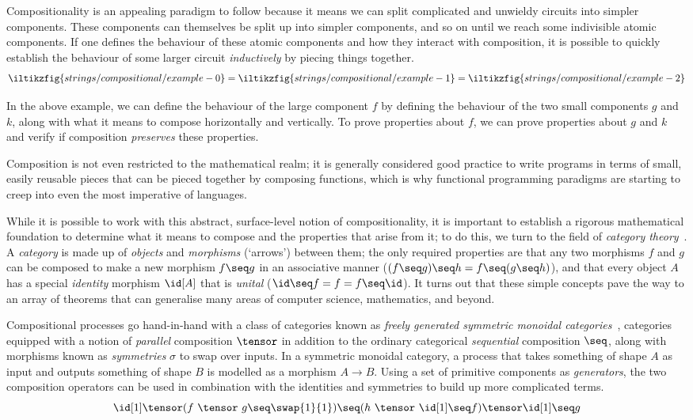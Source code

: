 Compositionality is an appealing paradigm to follow because it means we can
split complicated and unwieldy circuits into simpler components.
These components can themselves be split up into simpler components, and so on
until we reach some indivisible atomic components.
If one defines the behaviour of these atomic components and how they interact
with composition, it is possible to quickly establish the behaviour of some
larger circuit \emph{inductively} by piecing things together.
\[
    \iltikzfig{strings/compositional/example-0}
    =
    \iltikzfig{strings/compositional/example-1}
    =
    \iltikzfig{strings/compositional/example-2}
\]

In the above example, we can define the behaviour of the large component \(f\)
by defining the behaviour of the two small components \(g\) and \(k\), along
with what it means to compose horizontally and vertically.
To prove properties about \(f\), we can prove properties about \(g\) and \(k\)
and verify if composition \emph{preserves} these properties.

Composition is not even restricted to the mathematical realm; it is generally
considered good practice to write programs in terms of small, easily reusable
pieces that can be pieced together by composing functions, which is why
functional programming paradigms are starting to creep into even the most
imperative of languages.

While it is possible to work with this abstract, surface-level notion of
compositionality, it is important to establish a rigorous mathematical
foundation to determine what it means to compose and the properties that
arise from it; to do this, we turn to the field of
\emph{category theory}~\cite{maclane1978categories}.
A \emph{category} is made up of \emph{objects} and \emph{morphisms} (`arrows')
between them; the only required properties are that any two morphisms \(f\) and
\(g\) can be composed to make a new morphism \(f \seq g\) in an
associative manner (\((f \seq g) \seq h = f \seq (g \seq h)\)), and that every
object \(A\) has a special \emph{identity} morphism \(\id[A]\) that is
\emph{unital} (\(\id \seq f = f = f \seq \id\)).
It turns out that these simple concepts pave the way to an array of
theorems that can generalise many areas of computer science, mathematics, and
beyond.

Compositional processes go hand-in-hand with a class of categories known as
\emph{freely generated symmetric monoidal categories}~\cite{maclane1963natural},
categories equipped with a notion of \emph{parallel} composition \(\tensor\) in
addition to the ordinary categorical \emph{sequential} composition \(\seq\),
along with morphisms known as \emph{symmetries} \(\sigma\) to swap over inputs.
In a symmetric monoidal category, a process that takes something of shape \(A\)
as input and outputs something of shape \(B\) is modelled as a morphism
\(A \to B\).
Using a set of primitive components as \emph{generators}, the two composition
operators can be used in combination with the identities and symmetries to build
up more complicated terms.
\[
    \id[1]
    \tensor
    (f\ \tensor\ g
    \seq
    \swap{1}{1}
    )
    \seq
    (h\ \tensor\ \id[1] \seq f)
    \tensor
    \id[1]
    \seq
    g
\]


